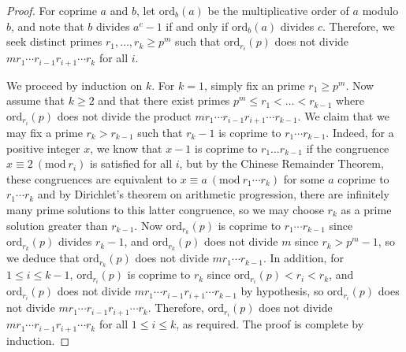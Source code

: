 \documentclass[11pt]{article}
\numberwithin{equation}{section}
\theoremstyle{shdefinition}
\theoremstyle{shplain}
\newcommand{\<}{\langle}
\renewcommand{\>}{\rangle}
\renewcommand{\leq}{\leqslant}
\renewcommand{\geq}{\geqslant}
\renewcommand{\:}{\colon}
\newcommand{\ord}{\mathrm{ord}}
\renewcommand{\mod}[1]{\mathrm{ \ } (\mathrm{mod\ } #1)}
\begin{document}
\begin{proof}
For coprime $a$ and $b$, let $\ord_b(a)$ be the multiplicative order of $a$ modulo $b$, and note that $b$ divides $a^c-1$ if and only if $\ord_b(a)$ divides $c$. Therefore, we seek distinct primes $r_1,\dots,r_k \geq p^m$ such that $\ord_{r_i}(p)$ does not divide $mr_1 \cdots r_{i-1} r_{i+1} \cdots r_k$ for all $i$.

We proceed by induction on $k$. For $k=1$, simply fix an prime $r_1 \geq p^m$. Now assume that $k \geq 2$ and that there exist primes $p^m \leq r_1 < \dots < r_{k-1}$ where $\ord_{r_i}(p)$ does not divide the product $mr_1 \cdots r_{i-1} r_{i+1} \cdots r_{k-1}$. We claim that we may fix a prime $r_k > r_{k-1}$ such that $r_k-1$ is coprime to $r_1 \cdots r_{k-1}$. Indeed, for a positive integer $x$, we know that $x-1$ is coprime to $r_1 \dots r_{k-1}$ if the congruence $x \equiv 2 \mod{r_i}$ is satisfied for all $i$, but by the Chinese Remainder Theorem, these congruences are equivalent to $x \equiv a \mod{r_1 \cdots r_k}$ for some $a$ coprime to $r_1 \cdots r_k$ and by Dirichlet's theorem on arithmetic progression, there are infinitely many prime solutions to this latter congruence, so we may choose $r_k$ as a prime solution greater than $r_{k-1}$. Now $\ord_{r_k}(p)$ is coprime to $r_1 \cdots r_{k-1}$ since $\ord_{r_k}(p)$ divides $r_k-1$, and $\ord_{r_k}(p)$ does not divide $m$ since $r_k > p^m-1$, so we deduce that $\ord_{r_k}(p)$ does not divide $mr_1 \cdots r_{k-1}$. In addition, for $1 \leq i \leq k-1$, $\ord_{r_i}(p)$ is coprime to $r_k$ since $\ord_{r_i}(p) < r_i < r_k$, and $\ord_{r_i}(p)$ does not divide $mr_1 \cdots r_{i-1} r_{i+1} \cdots r_{k-1}$ by hypothesis, so $\ord_{r_i}(p)$ does not divide $mr_1 \cdots r_{i-1} r_{i+1} \cdots r_k$. Therefore, $\ord_{r_i}(p)$ does not divide $mr_1 \cdots r_{i-1}r_{i+1} \cdots r_k$ for all $1 \leq i \leq k$, as required. The proof is complete by induction.
\end{proof}
\end{document}

